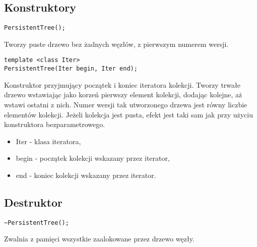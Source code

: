 \documentclass[a4paper,twoside]{article}
\begin{document}
	\subsection{Konstruktory}
	\begin{lstlisting}[caption=Konstruktor bezparametrowy]
PersistentTree();
	\end{lstlisting}
	Tworzy puste drzewo bez żadnych węzłów, z pierwszym numerem wersji.
	\begin{lstlisting}[caption=Konstruktor z iteratorem]
template <class Iter>
PersistentTree(Iter begin, Iter end);
	\end{lstlisting}
	Konstruktor przyjmujący początek i koniec iteratora kolekcji. Tworzy trwałe drzewo wstawiając jako korzeń pierwszy element kolekcji, dodając kolejne, aż wstawi ostatni z nich. Numer wersji tak utworzonego drzewa jest równy liczbie elementów kolekcji. Jeżeli kolekcja jest pusta, efekt jest taki sam jak przy użyciu konstruktora bezparametrowego.
	\begin{itemize}
		\item Iter - klasa iteratora,
		\item begin - początek kolekcji wskazany przez iterator,
		\item end - koniec kolekcji wskazany przez iterator.
	\end{itemize}
	\subsection{Destruktor}
	\begin{lstlisting}[caption=Destruktor]
~PersistentTree();
	\end{lstlisting}
	Zwalnia z pamięci wszystkie zaalokowane przez drzewo węzły.
\end{document}
